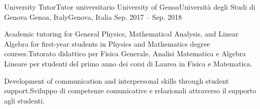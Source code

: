 \begin{cventries}
\cventry
{\ifenglish University Tutor\else Tutor universitario\fi} %
{\ifenglish University of Genoa\else Università degli Studi di Genova\fi} %
{\ifenglish Genoa, Italy\else Genova, Italia\fi} %
{Sep. 2017 -- Sep. 2018} %
{ %
\begin{cvitems}
\item {\ifenglish Academic tutoring for General Physics, Mathematical Analysis, and Linear Algebra for first-year students in Physics and Mathematics degree courses.\else Tutorato didattico per Fisica Generale, Analisi Matematica e Algebra Lineare per studenti del primo anno dei corsi di Laurea in Fisica e Matematica.\fi}
\item {\ifenglish Development of communication and interpersonal skills through student support.\else Sviluppo di competenze comunicative e relazionali attraverso il supporto agli studenti.\fi}
\end{cvitems}
}


\end{cventries}